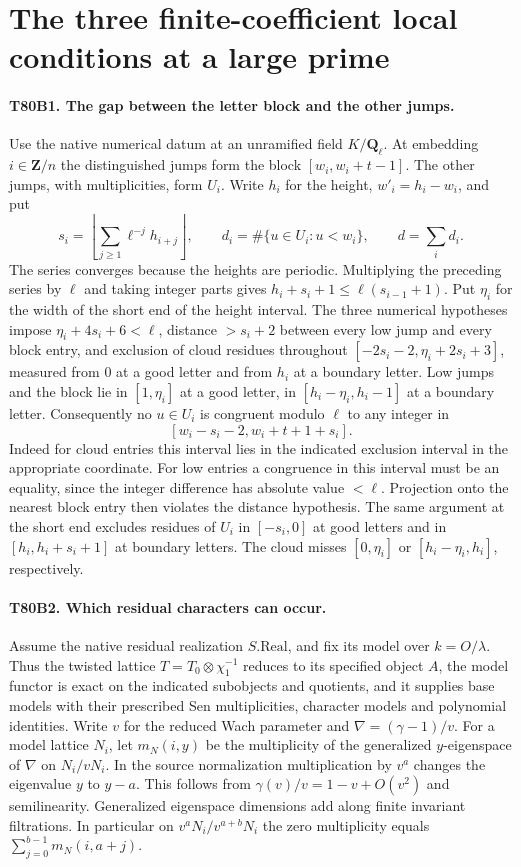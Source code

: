 \section{The three finite-coefficient local conditions at a large prime}

\paragraph{T80B1. The gap between the letter block and the other jumps.}
Use the native numerical datum at an unramified field $K/\mathbf Q_\ell$.
At embedding $i\in\mathbf Z/n$ the distinguished jumps form the block
$[w_i,w_i+t-1]$. The other jumps, with multiplicities, form $U_i$.
Write $h_i$ for the height, $w'_i=h_i-w_i$, and put
\[
 s_i=\left\lfloor\sum_{j\ge1}\ell^{-j}h_{i+j}\right\rfloor,
 \qquad d_i=\#\{u\in U_i:u<w_i\},\qquad d=\sum_i d_i .
\]
The series converges because the heights are periodic. Multiplying the
preceding series by $\ell$ and taking integer parts gives
$h_i+s_i+1\le\ell(s_{i-1}+1)$. Put $\eta_i$ for the width of the
short end of the height interval. The three numerical hypotheses impose
$\eta_i+4s_i+6<\ell$, distance $>s_i+2$ between every low jump and
every block entry, and exclusion of cloud residues throughout
$[-2s_i-2,\eta_i+2s_i+3]$, measured from $0$ at a good letter and
from $h_i$ at a boundary letter. Low jumps and the block lie in
$[1,\eta_i]$ at a good letter, in $[h_i-\eta_i,h_i-1]$ at a boundary
letter. Consequently no $u\in U_i$ is congruent modulo $\ell$ to any
integer in
\[
 [w_i-s_i-2,w_i+t+1+s_i].                                      \tag{T80.1}
\]
Indeed for cloud entries this interval lies in the indicated exclusion
interval in the appropriate coordinate. For low entries a congruence
in this interval must be an equality, since the integer difference has
absolute value $<\ell$. Projection onto the nearest block entry then
violates the distance hypothesis. The same argument at the short end
excludes residues of $U_i$ in $[-s_i,0]$ at good letters and in
$[h_i,h_i+s_i+1]$ at boundary letters. The cloud misses
$[0,\eta_i]$ or $[h_i-\eta_i,h_i]$, respectively.

\paragraph{T80B2. Which residual characters can occur.}
Assume the native residual realization $S.\mathrm{Real}$, and fix its
model over $k=O/\lambda$. Thus the twisted lattice
$T=T_0\otimes\chi_1^{-1}$ reduces to its specified object $A$, the
model functor is exact on the indicated subobjects and quotients, and it
supplies base models with their prescribed Sen multiplicities, character
models and polynomial identities. Write $v$ for the reduced Wach
parameter and $\nabla=(\gamma-1)/v$.
For a model lattice $N_i$, let $m_N(i,y)$ be the multiplicity of the
generalized $y$-eigenspace of $\nabla$ on $N_i/vN_i$. In the source
normalization multiplication by $v^a$ changes the eigenvalue $y$ to
$y-a$. This follows from $\gamma(v)/v=1-v+O(v^2)$ and semilinearity.
Generalized eigenspace dimensions add along finite invariant filtrations.
In particular on $v^aN_i/v^{a+b}N_i$ the zero multiplicity equals
$\sum_{j=0}^{b-1}m_N(i,a+j)$.


